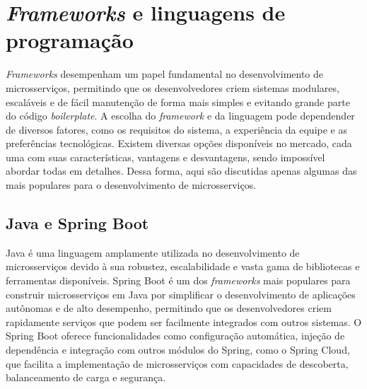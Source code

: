 

\section{\emph{Frameworks} e linguagens de programação}

\emph{Frameworks} desempenham um papel fundamental no desenvolvimento de microsserviços, permitindo que os desenvolvedores criem sistemas modulares, escaláveis e de fácil manutenção de forma mais simples e evitando grande parte do código \emph{boilerplate}. A escolha do \emph{framework} e da linguagem pode dependender de diversos fatores, como os requisitos do sistema, a experiência da equipe e as preferências tecnológicas. Existem diversas opções disponíveis no mercado, cada uma com suas características, vantagens e desvantagens, sendo impossível abordar todas em detalhes. Dessa forma, aqui são discutidas apenas algumas das mais populares para o desenvolvimento de microsserviços.

\subsection{Java e Spring Boot}
Java é uma linguagem amplamente utilizada no desenvolvimento de microsserviços devido à sua robustez, escalabilidade e vasta gama de bibliotecas e ferramentas disponíveis. Spring Boot é um dos \emph{frameworks} mais populares para construir microsserviços em Java por simplificar o desenvolvimento de aplicações autônomas e de alto desempenho, permitindo que os desenvolvedores criem rapidamente serviços que podem ser facilmente integrados com outros sistemas. O Spring Boot oferece funcionalidades como configuração automática, injeção de dependência e integração com outros módulos do Spring, como o Spring Cloud, que facilita a implementação de microsserviços com capacidades de descoberta, balanceamento de carga e segurança. 
\cite{springboot}

